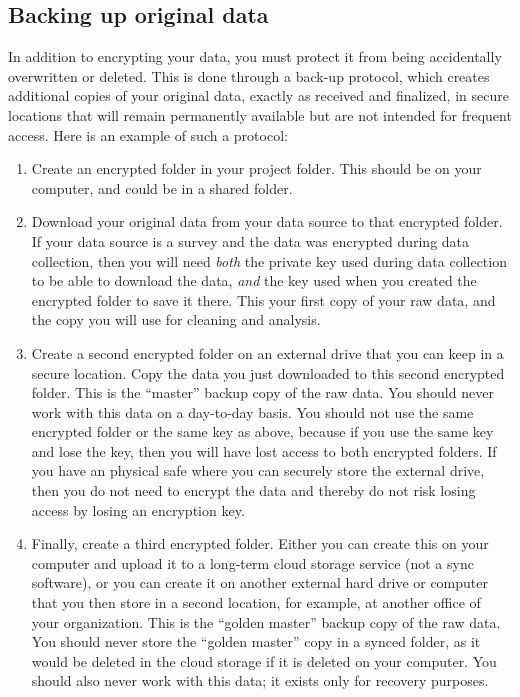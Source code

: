 \subsection{Backing up original data}
In addition to encrypting your data, you must protect it
from being accidentally overwritten or deleted.
This is done through a back-up protocol,
which creates additional copies of your original data,
exactly as received and finalized,
in secure locations that will remain permanently available
but are not intended for frequent access.
Here is an example of such a protocol:

\begin{enumerate}
	\item Create an encrypted folder in your project folder.
	This should be on your computer, and could be in a shared folder.

	\item Download your original data from your data source to that encrypted folder.
	If your data source is a survey and the data was encrypted during data collection,
	then you will need \textit{both} the
	private key used during data collection to be able to download the data,
	\textit{and} the key used when you created the encrypted folder to save it there.
	This your first copy of your raw data, and the copy you will use for cleaning and analysis.

	\item Create a second encrypted folder on an external drive that you can keep in a secure location.
	Copy the data you just downloaded to this second encrypted folder.
	This is the ``master'' backup copy of the raw data.
	You should never work with this data on a day-to-day basis.
	You should not use the same encrypted folder or the same key as above,
	because if you use the same key and lose the key,
	then you will have lost access to both encrypted folders.
	If you have an physical safe where you can securely store the external drive,
	then you do not need to encrypt the data
	and thereby do not risk losing access by losing an encryption key.

	\item Finally, create a third encrypted folder.
	Either you can create this on your computer and upload it to a long-term cloud storage service (not a sync software),
	or you can create it on	another external hard drive or computer that you then store in a second location,
	for example, at another office of your organization.
	This is the ``golden master'' backup copy of the raw data.
	You should never store the ``golden master'' copy in a synced folder,
	as it would be deleted in the cloud storage if it is deleted on your computer.
	You should also never work with this data;
	it exists only for recovery purposes.
\end{enumerate}

